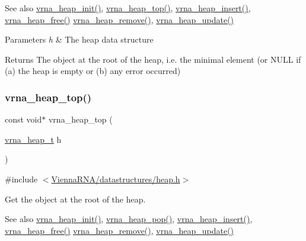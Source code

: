 \begin{DoxySeeAlso}{See also}
\mbox{\hyperlink{group__heap__utils_gafd02db4841338bad6f551e3e2bd2161f}{vrna\+\_\+heap\+\_\+init()}}, \mbox{\hyperlink{group__heap__utils_ga534a8483824371019241e340c026111b}{vrna\+\_\+heap\+\_\+top()}}, \mbox{\hyperlink{group__heap__utils_ga91cf0042c894de44c4eb7b47707260a8}{vrna\+\_\+heap\+\_\+insert()}}, \mbox{\hyperlink{group__heap__utils_ga2a4915c6e66b8831644857df0715c3ce}{vrna\+\_\+heap\+\_\+free()}} \mbox{\hyperlink{group__heap__utils_ga5e181d5ef8557d502943b938620c7174}{vrna\+\_\+heap\+\_\+remove()}}, \mbox{\hyperlink{group__heap__utils_gabdd04b8719b3d85c5ad53ed7dec9700b}{vrna\+\_\+heap\+\_\+update()}}
\end{DoxySeeAlso}

\begin{DoxyParams}{Parameters}
{\em h} & The heap data structure \\
\hline
\end{DoxyParams}
\begin{DoxyReturn}{Returns}
The object at the root of the heap, i.\+e. the minimal element (or N\+U\+LL if (a) the heap is empty or (b) any error occurred) 
\end{DoxyReturn}
\mbox{\label{group__heap__utils_ga534a8483824371019241e340c026111b}} 
\subsubsection{\texorpdfstring{vrna\_heap\_top()}{vrna\_heap\_top()}}
{\footnotesize\ttfamily const void$\ast$ vrna\+\_\+heap\+\_\+top (\begin{DoxyParamCaption}\item[{\mbox{\hyperlink{group__heap__utils_ga341ea87a651145b986792f6eb3e679c3}{vrna\+\_\+heap\+\_\+t}}}]{h }\end{DoxyParamCaption})}



{\ttfamily \#include $<$\mbox{\hyperlink{heap_8h}{Vienna\+R\+N\+A/datastructures/heap.\+h}}$>$}



Get the object at the root of the heap. 

\begin{DoxySeeAlso}{See also}
\mbox{\hyperlink{group__heap__utils_gafd02db4841338bad6f551e3e2bd2161f}{vrna\+\_\+heap\+\_\+init()}}, \mbox{\hyperlink{group__heap__utils_ga3b6242f3a1194eb1df2d1fb40d630610}{vrna\+\_\+heap\+\_\+pop()}}, \mbox{\hyperlink{group__heap__utils_ga91cf0042c894de44c4eb7b47707260a8}{vrna\+\_\+heap\+\_\+insert()}}, \mbox{\hyperlink{group__heap__utils_ga2a4915c6e66b8831644857df0715c3ce}{vrna\+\_\+heap\+\_\+free()}} \mbox{\hyperlink{group__heap__utils_ga5e181d5ef8557d502943b938620c7174}{vrna\+\_\+heap\+\_\+remove()}}, \mbox{\hyperlink{group__heap__utils_gabdd04b8719b3d85c5ad53ed7dec9700b}{vrna\+\_\+heap\+\_\+update()}}
\end{DoxySeeAlso}

